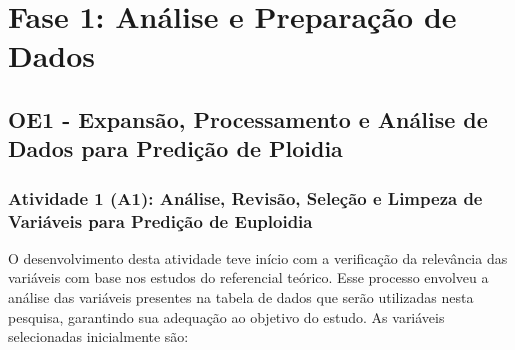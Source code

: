 \section{Fase 1: Análise e Preparação de Dados}
\subsection{OE1 - Expansão, Processamento e Análise de Dados para Predição de Ploidia}
\subsubsection{Atividade 1 (A1): Análise, Revisão, Seleção e Limpeza de Variáveis para Predição de Euploidia}
O desenvolvimento desta atividade teve início com a verificação da relevância das variáveis com base nos estudos do referencial teórico. Esse processo envolveu a análise das variáveis presentes na tabela de dados que serão utilizadas nesta pesquisa, garantindo sua adequação ao objetivo do estudo. As variáveis selecionadas inicialmente são:
